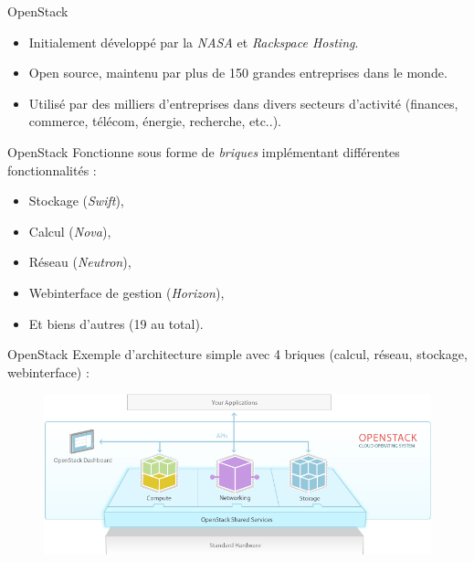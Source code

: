 \documentclass{beamer}
\begin{document}
\begin{frame}{OpenStack}
    \begin{itemize}
        \item {
        Initialement développé par la \textit{NASA} et \textit{Rackspace Hosting}.
        }\pause
        \item {
        Open source, maintenu par plus de 150 grandes entreprises dans le monde.
        }\pause
        \item {
        Utilisé par des milliers d'entreprises dans divers secteurs d'activité (finances, commerce, télécom, énergie, recherche, etc..).
        }\pause
    \end{itemize}
\end{frame}

\begin{frame}{OpenStack}
    Fonctionne sous forme de \textit{briques} implémentant différentes fonctionnalités :
    \pause
    \begin{itemize}
        \item {
        Stockage (\textit{Swift}),
        }\pause
        \item {
        Calcul (\textit{Nova}),
        }\pause
        \item {
        Réseau (\textit{Neutron}),
        }\pause
        \item {
        Webinterface de gestion (\textit{Horizon}),
        }\pause
        \item {
        Et biens d'autres (19 au total).
        }\pause
    \end{itemize}
\end{frame}

\begin{frame}{OpenStack}
    Exemple d'architecture simple avec 4 briques (calcul, réseau, stockage, webinterface) :
    \begin{figure}[h]
        \includegraphics[width=\textwidth]{images/openstack-software-diagram.png}
    \end{figure}
\end{frame}
\end{document}
